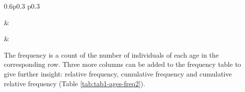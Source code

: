 \documentclass[
]{memoir}
\begin{document}
\begin{table}[ht]
\begin{centerbox}
\begin{threeparttable}
\begin{tabularx}{0.6\textwidth}{p{} p{}}
\hhline{}

 &
 \tabularnewline[-0.5pt]


\hhline{}

 &
 \tabularnewline[-0.5pt]


\end{tabularx}
\end{threeparttable}\par\end{centerbox}

\end{table}
 

The frequency is a count of the number of individuals of each age in the corresponding row. Three more columns can be added to the frequency table to give further insight: relative frequency, cumulative frequency and cumulative relative frequency (Table \ref{tab:tab1-ages-freq2}).

 
  \providecommand{\huxb}[2]{\arrayrulecolor[RGB]{#1}\global\arrayrulewidth=#2pt}
  \providecommand{\huxvb}[2]{\color[RGB]{#1}\vrule width #2pt}
  \providecommand{\huxtpad}[1]{\rule{0pt}{#1}}
  \providecommand{\huxbpad}[1]{\rule[-#1]{0pt}{#1}}
\end{document}
